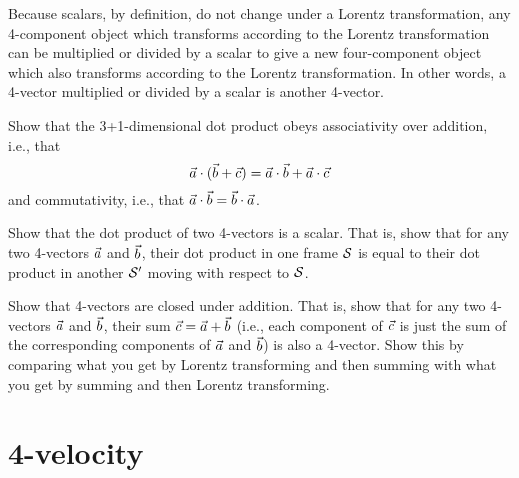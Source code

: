 Because scalars, by definition, do not change under a Lorentz
transformation, any 4-component object which transforms according to
the Lorentz transformation can be multiplied or divided by a scalar to
give a new four-component object which also transforms according to
the Lorentz transformation.  In other words, a 4-vector multiplied or
divided by a scalar is another 4-vector.

\begin{problem}
Show that the 3+1-dimensional dot product obeys associativity
over addition, i.e., that
\begin{equation}
\vec{a}\cdot(\vec{b}+\vec{c}) = \vec{a}\cdot\vec{b}+\vec{a}\cdot\vec{c}
\end{equation}
and commutativity, i.e., that $\vec{a}\cdot\vec{b}=\vec{b}\cdot\vec{a}$.
\end{problem}

\begin{problem}
 Show that the dot product of two 4-vectors is a scalar.  That is,
show that for any two 4-vectors $\vec{a}$ and $\vec{b}$, their dot
product in one frame $\cal S$ is equal to their dot product in
another $\cal S'$ moving with respect to $\cal S$.
\end{problem}

\begin{problem}
Show that 4-vectors are closed under addition.  That is, show
that for any two 4-vectors $\vec{a}$ and $\vec{b}$, their sum
$\vec{c}=\vec{a}+\vec{b}$ (i.e., each component of $\vec{c}$ is just the
sum of the corresponding components of $\vec{a}$ and $\vec{b}$) is also
a 4-vector.  Show this by comparing what you get by Lorentz
transforming and then summing with what you get by summing and then
Lorentz transforming.
\end{problem}


\section{4-velocity}
\label{sec:4-vel}

